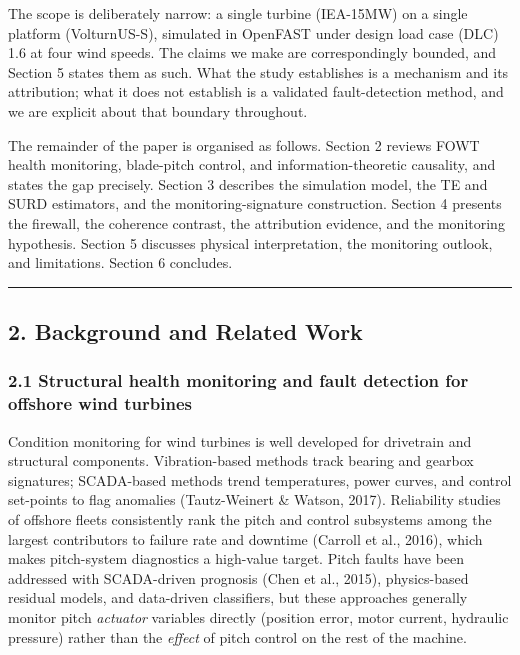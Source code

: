 \documentclass[
  english,
  11pt,
]{article}
\begin{document}
The scope is deliberately narrow: a single turbine (IEA-15MW) on a
single platform (VolturnUS-S), simulated in OpenFAST under design load
case (DLC) 1.6 at four wind speeds. The claims we make are
correspondingly bounded, and Section 5 states them as such. What the
study establishes is a mechanism and its attribution; what it does not
establish is a validated fault-detection method, and we are explicit
about that boundary throughout.

The remainder of the paper is organised as follows. Section 2 reviews
FOWT health monitoring, blade-pitch control, and information-theoretic
causality, and states the gap precisely. Section 3 describes the
simulation model, the TE and SURD estimators, and the
monitoring-signature construction. Section 4 presents the firewall, the
coherence contrast, the attribution evidence, and the monitoring
hypothesis. Section 5 discusses physical interpretation, the monitoring
outlook, and limitations. Section 6 concludes.

\begin{center}\rule{0.5\linewidth}{0.5pt}\end{center}

\subsection{2. Background and Related
Work}\label{background-and-related-work}

\subsubsection{2.1 Structural health monitoring and fault detection for
offshore wind
turbines}\label{structural-health-monitoring-and-fault-detection-for-offshore-wind-turbines}

Condition monitoring for wind turbines is well developed for drivetrain
and structural components. Vibration-based methods track bearing and
gearbox signatures; SCADA-based methods trend temperatures, power
curves, and control set-points to flag anomalies (Tautz-Weinert \&
Watson, 2017). Reliability studies of offshore fleets consistently rank
the pitch and control subsystems among the largest contributors to
failure rate and downtime (Carroll et al., 2016), which makes
pitch-system diagnostics a high-value target. Pitch faults have been
addressed with SCADA-driven prognosis (Chen et al., 2015), physics-based
residual models, and data-driven classifiers, but these approaches
generally monitor pitch \emph{actuator} variables directly (position
error, motor current, hydraulic pressure) rather than the \emph{effect}
of pitch control on the rest of the machine.
\end{document}
